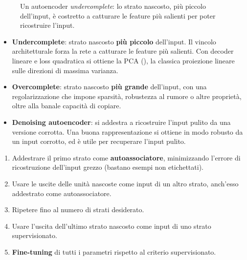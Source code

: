 \begin{figure}[ht]
\centering
{}
\caption{Un autoencoder \emph{undercomplete}: lo strato nascosto, più piccolo dell'input, è costretto a catturare le
feature più salienti per poter ricostruire l'input.}
\label{fig:autoencoder}
\end{figure}

\begin{itemize}
  \item \textbf{Undercomplete}: strato nascosto \textbf{più piccolo} dell'input. Il vincolo architetturale forza la
        rete a catturare le feature più salienti. Con decoder lineare e loss quadratica si ottiene la PCA
        (), la classica proiezione lineare sulle direzioni di massima varianza.
  \item \textbf{Overcomplete}: strato nascosto \textbf{più grande} dell'input, con una regolarizzazione che impone
        sparsità, robustezza al rumore o altre proprietà, oltre alla banale capacità di copiare.
  \item \textbf{Denoising autoencoder}: si addestra a ricostruire l'input pulito da una versione corrotta. Una buona
        rappresentazione si ottiene in modo robusto da un input corrotto, ed è utile per recuperare l'input pulito.
\end{itemize}

\begin{algoritmo}
\begin{enumerate}
  \item Addestrare il primo strato come \textbf{autoassociatore}, minimizzando l'errore di ricostruzione dell'input
        grezzo (bastano esempi non etichettati).
  \item Usare le uscite delle unità nascoste come input di un altro strato, anch'esso addestrato come autoassociatore.
  \item Ripetere fino al numero di strati desiderato.
  \item Usare l'uscita dell'ultimo strato nascosto come input di uno strato supervisionato.
  \item \textbf{Fine-tuning} di tutti i parametri rispetto al criterio supervisionato.
\end{enumerate}
\end{algoritmo}

